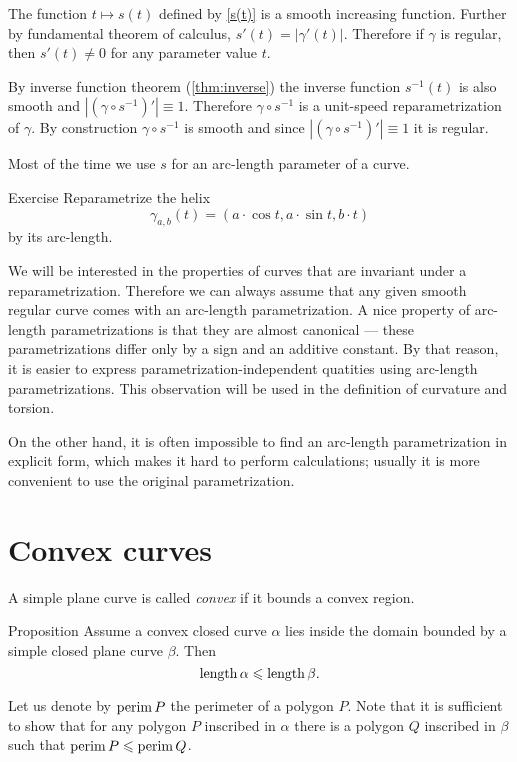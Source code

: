  The function $t\mapsto s(t)$ defined by \ref{s(t)} is a smooth increasing function.
Further by fundamental theorem of calculus, $s'(t)=|\gamma'(t)|$.
Therefore if $\gamma$ is regular, then $s'(t)\ne0$ for any parameter value $t$.

By inverse function theorem (\ref{thm:inverse}) the inverse function $s^{-1}(t)$ is also smooth
and $|(\gamma\circ s^{-1})'|\equiv1$.
Therefore $\gamma\circ s^{-1}$ is a unit-speed reparametrization  of $\gamma$.
By construction $\gamma\circ s^{-1}$ is smooth and since $|(\gamma\circ s^{-1})'|\equiv1$ it is regular.
\qeds

Most of the time we use $s$ for an arc-length parameter of a curve.

\begin{thm}{Exercise}\label{ex:arc-length-helix}
Reparametrize the helix 
\[\gamma_{a,b}(t)=(a\cdot\cos t,a\cdot \sin t, b\cdot t)\]
by its arc-length.
\end{thm}

We will be interested in the properties of curves that are invariant under a reparametrization.
Therefore we can always assume that any given smooth regular curve comes with an arc-length parametrization.
A nice property of arc-length parametrizations is that they are almost canonical --- these parametrizations differ only by a sign and an additive constant.
By that reason, it is easier to express parametrization-independent quatities using arc-length parametrizations.
This observation will be used in the definition of curvature and torsion.

On the other hand, it is often impossible to find an arc-length parametrization in explicit form, which makes it hard to perform calculations;
usually it is more convenient to use the original parametrization.

\section{Convex curves}

A simple plane curve is called \emph{convex} if it bounds a convex region.

\begin{thm}{Proposition}\label{prop:convex-curve}
Assume a convex closed curve $\alpha$ lies inside the domain bounded by a simple closed plane curve $\beta$.
Then
\[\mathop{\rm length}\nolimits\alpha\leqslant \mathop{\rm length}\nolimits\beta.\]
\end{thm}

Let us denote by $\mathop{\rm perim}\nolimits P$ the perimeter of a polygon $P$.
Note that it is sufficient to show that for any polygon  $P$ inscribed in $\alpha$ there is a polygon $Q$ inscribed in $\beta$ such that
$\mathop{\rm perim}\nolimits P\leqslant \mathop{\rm perim}\nolimits Q$.

